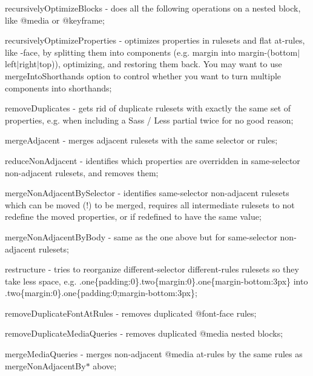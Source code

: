 \begin{DoxyItemize}
\item {\ttfamily recursively\+Optimize\+Blocks} -\/ does all the following operations on a nested block, like {\ttfamily @media} or {\ttfamily @keyframe};
\item {\ttfamily recursively\+Optimize\+Properties} -\/ optimizes properties in rulesets and flat at-\/rules, like -\/face, by splitting them into components (e.\+g. {\ttfamily margin} into {\ttfamily margin-\/(bottom$\vert$left$\vert$right$\vert$top)}), optimizing, and restoring them back. You may want to use {\ttfamily merge\+Into\+Shorthands} option to control whether you want to turn multiple components into shorthands;
\item {\ttfamily remove\+Duplicates} -\/ gets rid of duplicate rulesets with exactly the same set of properties, e.\+g. when including a Sass / Less partial twice for no good reason;
\item {\ttfamily merge\+Adjacent} -\/ merges adjacent rulesets with the same selector or rules;
\item {\ttfamily reduce\+Non\+Adjacent} -\/ identifies which properties are overridden in same-\/selector non-\/adjacent rulesets, and removes them;
\item {\ttfamily merge\+Non\+Adjacent\+By\+Selector} -\/ identifies same-\/selector non-\/adjacent rulesets which can be moved (!) to be merged, requires all intermediate rulesets to not redefine the moved properties, or if redefined to have the same value;
\item {\ttfamily merge\+Non\+Adjacent\+By\+Body} -\/ same as the one above but for same-\/selector non-\/adjacent rulesets;
\item {\ttfamily restructure} -\/ tries to reorganize different-\/selector different-\/rules rulesets so they take less space, e.\+g. {\ttfamily .one\{padding\+:0\}.two\{margin\+:0\}.one\{margin-\/bottom\+:3px\}} into {\ttfamily .two\{margin\+:0\}.one\{padding\+:0;margin-\/bottom\+:3px\}};
\item {\ttfamily remove\+Duplicate\+Font\+At\+Rules} -\/ removes duplicated {\ttfamily @font-\/face} rules;
\item {\ttfamily remove\+Duplicate\+Media\+Queries} -\/ removes duplicated {\ttfamily @media} nested blocks;
\item {\ttfamily merge\+Media\+Queries} -\/ merges non-\/adjacent {\ttfamily @media} at-\/rules by the same rules as {\ttfamily merge\+Non\+Adjacent\+By$\ast$} above;
\end{DoxyItemize}

